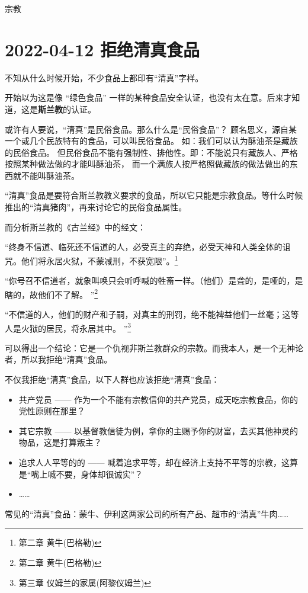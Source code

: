 \begin{taged}{宗教}
\section{2022-04-12 拒绝清真食品}
\end{taged}

不知从什么时候开始，不少食品上都印有“清真”字样。

开始以为这是像 “绿色食品” 一样的某种食品安全认证，也没有太在意。后来才知道，这是\textbf{斯兰教}的认证。

或许有人要说，“清真”是民俗食品。那么什么是“民俗食品”？
顾名思义，源自某一个或几个民族特有的食品，可以叫民俗食品。
如：我们可以认为酥油茶是藏族的民俗食品。
但民俗食品不能有强制性、排他性。即：不能说只有藏族人、严格按照某种做法做的才能叫酥油茶，
而一个满族人按严格照做藏族的做法做出的东西就不能叫酥油茶。

“清真”食品是要符合斯兰教教义要求的食品，所以它只能是宗教食品。等什么时候推出的“清真猪肉”，再来讨论它的民俗食品属性。

而分析斯兰教的《古兰经》中的经文：

“终身不信道、临死还不信道的人，必受真主的弃绝，必受天神和人类全体的诅咒。他们将永居火狱，不蒙减刑，不获宽限”。\footnote{第二章 黄牛(巴格勒)  }

“你号召不信道者，就象叫唤只会听呼喊的牲畜一样。（他们）是聋的，是哑的，是瞎的，故他们不了解。 ”\footnote{第二章 黄牛(巴格勒) }

“不信道的人，他们的财产和子嗣，对真主的刑罚，绝不能裨益他们一丝毫；这等人是火狱的居民，将永居其中。 ”\footnote{第三章 仪姆兰的家属(阿黎仪姆兰) }

可以得出一个结论：它是一个仇视非斯兰教群众的宗教。而我本人，是一个无神论者，所以我拒绝“清真”食品。

不仅我拒绝“清真”食品，以下人群也应该拒绝“清真”食品：

\begin{itemize}[nosep, left=\parindent]
    \item 共产党员 —— 作为一个不能有宗教信仰的共产党员，成天吃宗教食品，你的党性原则在那里？
    \item 其它宗教 —— 以基督教信徒为例，拿你的主赐予你的财富，去买其他神灵的物品，这是打算叛主？
    \item 追求人人平等的的 —— 喊着追求平等，却在经济上支持不平等的宗教，这算是“嘴上喊不要，身体却很诚实”？
    \item ……
\end{itemize}

常见的“清真”食品：蒙牛、伊利这两家公司的所有产品、超市的“清真”牛肉……

